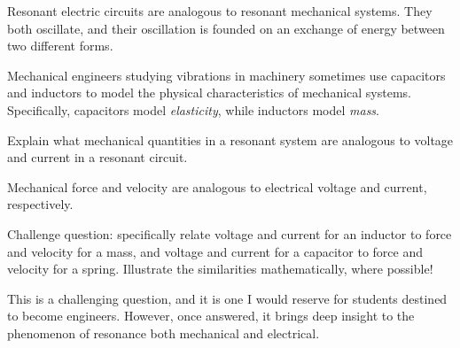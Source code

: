 

Resonant electric circuits are analogous to resonant mechanical systems.  They both oscillate, and their oscillation is founded on an exchange of energy between two different forms.

Mechanical engineers studying vibrations in machinery sometimes use capacitors and inductors to model the physical characteristics of mechanical systems.  Specifically, capacitors model {\it elasticity}, while inductors model {\it mass}.

Explain what mechanical quantities in a resonant system are analogous to voltage and current in a resonant circuit.







Mechanical force and velocity are analogous to electrical voltage and current, respectively.

\vskip 10pt

Challenge question: specifically relate voltage and current for an inductor to force and velocity for a mass, and voltage and current for a capacitor to force and velocity for a spring.  Illustrate the similarities mathematically, where possible!







This is a challenging question, and it is one I would reserve for students destined to become engineers.  However, once answered, it brings deep insight to the phenomenon of resonance both mechanical and electrical.



